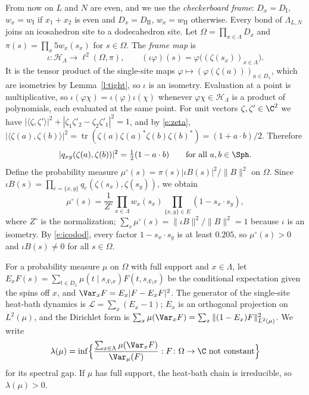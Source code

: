 From now on $L$ and $N$ are even, and we use the \emph{checkerboard frame}: $D_x = D_{\mathrm I}$, $w_x = w_{\mathrm I}$ if $x_1 + x_2$ is even and $D_x = D_{\mathrm{II}}$, $w_x = w_{\mathrm{II}}$ otherwise. Every bond of $\Lambda_{L, N}$ joins an icosahedron site to a dodecahedron site. Let $\Omega = \prod_{x \in \Lambda} D_x$ and $\pi(s) = \prod_{x} 5 w_x(s_x)$ for $s \in \Omega$. The \emph{frame map} is
\begin{equation*}
\iota \colon \mathcal H_\Lambda \to \ell^2(\Omega, \pi), \qquad (\iota \varphi)(s) = \varphi\bigl( (\zeta(s_x))_{x \in \Lambda} \bigr).
\end{equation*}
It is the tensor product of the single-site maps $\varphi \mapsto (\varphi(\zeta(a)))_{a \in D_x}$, which are isometries by Lemma~\ref{l:tight}, so $\iota$ is an isometry. Evaluation at a point is multiplicative, so $\iota(\varphi \chi) = \iota(\varphi) \iota(\chi)$ whenever $\varphi \chi \in \mathcal H_\Lambda$ is a product of polynomials, each evaluated at the same point. For unit vectors $\zeta, \zeta' \in \C^2$ we have $|\langle \zeta, \zeta' \rangle|^2 + |\zeta_1 \zeta'_2 - \zeta_2 \zeta'_1|^2 = 1$, and by \eqref{e:zeta}, $|\langle \zeta(a), \zeta(b) \rangle|^2 = \operatorname{tr}(\zeta(a) \zeta(a)^* \zeta(b) \zeta(b)^*) = (1 + a \cdot b)/2$. Therefore
\begin{equation}\label{e:qmod}
|q_{xy}(\zeta(a), \zeta(b))|^2 = \tfrac12 (1 - a \cdot b) \qquad \text{for all } a, b \in \Sph .
\end{equation}
Define the probability measure $\mu^\circ(s) = \pi(s) |\iota B(s)|^2 / \|B\|^2$ on $\Omega$. Since $\iota B(s) = \prod_{e = \{x, y\}} q_e(\zeta(s_x), \zeta(s_y))$, we obtain
\begin{equation}\label{e:mucirc}
\mu^\circ(s) = \frac{1}{Z^\circ} \prod_{x \in \Lambda} w_x(s_x) \prod_{\{x, y\} \in E} (1 - s_x \cdot s_y),
\end{equation}
where $Z^\circ$ is the normalization; $\sum_s \mu^\circ(s) = \|\iota B\|^2 / \|B\|^2 = 1$ because $\iota$ is an isometry. By \eqref{e:icodod}, every factor $1 - s_x \cdot s_y$ is at least $0.205$, so $\mu^\circ(s) > 0$ and $\iota B(s) \neq 0$ for all $s \in \Omega$.

For a probability measure $\mu$ on $\Omega$ with full support and $x \in \Lambda$, let $E_x F(s) = \sum_{t \in D_x} \mu(t \mid s_{\Lambda \setminus x}) F(t, s_{\Lambda \setminus x})$ be the conditional expectation given the spins off $x$, and $\Var_x F = E_x |F - E_x F|^2$. The generator of the single-site heat-bath dynamics is $\mathcal L = \sum_x (E_x - 1)$; $E_x$ is an orthogonal projection on $L^2(\mu)$, and the Dirichlet form is $\sum_x \mu(\Var_x F) = \sum_x \|(1 - E_x) F\|^2_{L^2(\mu)}$. We write
\begin{equation}\label{e:lambdaHB}
\lambda(\mu) = \inf \Bigl\{ \frac{\sum_{x \in \Lambda} \mu(\Var_x F)}{\Var_\mu(F)} : F \colon \Omega \to \C \text{ not constant} \Bigr\}
\end{equation}
for its spectral gap. If $\mu$ has full support, the heat-bath chain is irreducible, so $\lambda(\mu) > 0$.

